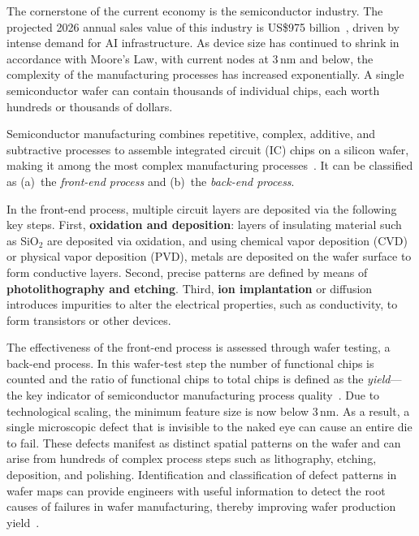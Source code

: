 \documentclass[conference]{IEEEtran}
\begin{document}
The cornerstone of the current economy is the semiconductor industry. The
projected 2026 annual sales value of this industry is US\$975
billion~\cite{sia2024}, driven by intense demand for AI infrastructure. As
device size has continued to shrink in accordance with Moore's Law, with
current nodes at 3\,nm and below, the complexity of the manufacturing
processes has increased exponentially. A single semiconductor wafer can contain
thousands of individual chips, each worth hundreds or thousands of dollars.

Semiconductor manufacturing combines repetitive, complex, additive, and
subtractive processes to assemble integrated circuit (IC) chips on a silicon
wafer, making it among the most complex manufacturing
processes~\cite{kahng2021}. It can be classified as (a)~the \emph{front-end
process} and (b)~the \emph{back-end process}.

In the front-end process, multiple circuit layers are deposited via the
following key steps. First, \textbf{oxidation and deposition}: layers of
insulating material such as SiO$_2$ are deposited via oxidation, and using
chemical vapor deposition (CVD) or physical vapor deposition (PVD), metals are
deposited on the wafer surface to form conductive layers. Second, precise
patterns are defined by means of \textbf{photolithography and etching}.
Third, \textbf{ion implantation} or diffusion introduces impurities to alter
the electrical properties, such as conductivity, to form transistors or other
devices.

The effectiveness of the front-end process is assessed through wafer testing,
a back-end process. In this wafer-test step the number of functional chips is
counted and the ratio of functional chips to total chips is defined as the
\emph{yield}---the key indicator of semiconductor manufacturing process
quality~\cite{weng2010}. Due to technological scaling, the minimum feature
size is now below 3\,nm. As a result, a single microscopic defect that is
invisible to the naked eye can cause an entire die to fail. These defects
manifest as distinct spatial patterns on the wafer and can arise from hundreds
of complex process steps such as lithography, etching, deposition, and
polishing. Identification and classification of defect patterns in wafer maps
can provide engineers with useful information to detect the root causes of
failures in wafer manufacturing, thereby improving wafer production
yield~\cite{chen2023}.

\end{document}
